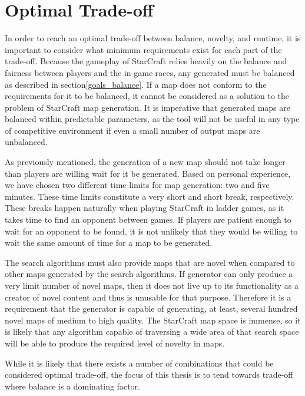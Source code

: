\section{Optimal Trade-off}
\label{goals_tradeoffs}
In order to reach an optimal trade-off between balance, novelty, and runtime, it is important to consider what minimum requirements exist for each part of the trade-off. Because the gameplay of StarCraft relies heavily on the balance and fairness between players and the in-game races, any generated must be balanced as described in section\ref{goals_balance}. If a map does not conform to the requirements for it to be balanced, it cannot be considered as a solution to the problem of StarCraft map generation. It is imperative that generated maps are balanced within predictable parameters, as the tool will not be useful in any type of competitive environment if even a small number of output maps are unbalanced.

As previously mentioned, the generation of a new map should not take longer than players are willing wait for it be generated. Based on personal experience, we have chosen two different time limits for map generation: two and five minutes. These time limits constitute a very short and short break, respectively. These breaks happen naturally when playing StarCraft in ladder games, as it takes time to find an opponent between games. If players are patient enough to wait for an opponent to be found, it is not unlikely that they would be willing to wait the same amount of time for a map to be generated.

The search algorithms must also provide maps that are novel when compared to other maps generated by the search algorithms. If generator can only produce a very limit number of novel maps, then it does not live up to its functionality as a creator of novel content and thus is unusable for that purpose. Therefore it is a requirement that the generator is capable of generating, at least, several hundred novel maps of medium to high quality. The StarCraft map space is immense, so it is likely that any algorithm capable of traversing a wide area of that search space will be able to produce the required level of novelty in maps.

While it is likely that there exists a number of combinations that could be considered optimal trade-off, the focus of this thesis is to tend towards trade-off where balance is a dominating factor.